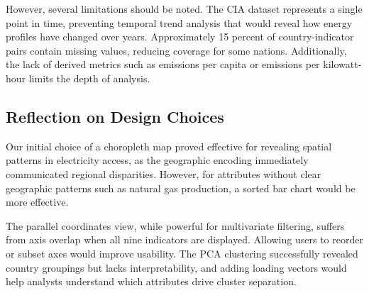 \documentclass[conference]{IEEEtran}
\begin{document}
However, several limitations should be noted. The CIA dataset represents a single point in time, preventing temporal trend analysis that would reveal how energy profiles have changed over years. Approximately 15 percent of country-indicator pairs contain missing values, reducing coverage for some nations. Additionally, the lack of derived metrics such as emissions per capita or emissions per kilowatt-hour limits the depth of analysis.

\subsection{Reflection on Design Choices}
Our initial choice of a choropleth map proved effective for revealing spatial patterns in electricity access, as the geographic encoding immediately communicated regional disparities. However, for attributes without clear geographic patterns such as natural gas production, a sorted bar chart would be more effective.

The parallel coordinates view, while powerful for multivariate filtering, suffers from axis overlap when all nine indicators are displayed. Allowing users to reorder or subset axes would improve usability. The PCA clustering successfully revealed country groupings but lacks interpretability, and adding loading vectors would help analysts understand which attributes drive cluster separation.
\end{document}
